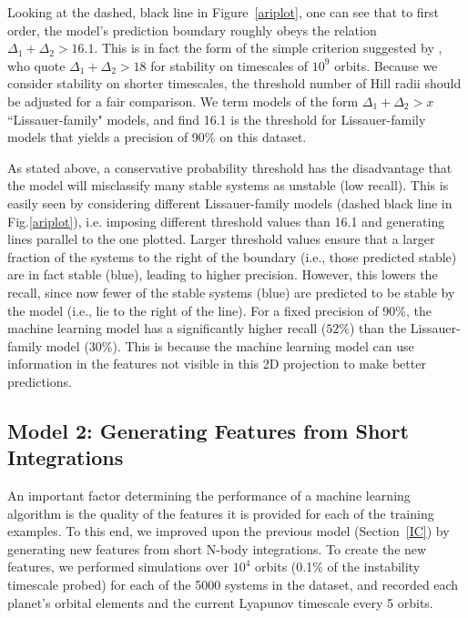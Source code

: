 Looking at the dashed, black line in Figure~\ref{ariplot}, one can see that to first order, the model's prediction boundary roughly obeys the relation $\Delta_1 + \Delta_2 > 16.1$.
This is in fact the form of the simple criterion suggested by \cite{Lissauer2011}, who quote $\Delta_1 + \Delta_2 > 18$ for stability on timescales of $10^9$ orbits. 
Because we consider stability on shorter timescales, the threshold number of Hill radii should be adjusted for a fair comparison.
We term models of the form $\Delta_1 + \Delta_2 > x$ ``Lissauer-family" models, and find 16.1 is the threshold for Lissauer-family models that yields a precision of 90\% on this dataset.

As stated above, a conservative probability threshold has the disadvantage that the model will misclassify many stable systems as unstable (low recall).  
This is easily seen by considering different Lissauer-family models (dashed black line in Fig.\:\ref{ariplot}), i.e. imposing different threshold values than 16.1 and generating lines parallel to the one plotted.
Larger threshold values ensure that a larger fraction of the systems to the right of the boundary (i.e., those predicted stable) are in fact stable (blue), leading to higher precision.
However, this lowers the recall, since now fewer of the stable systems (blue) are predicted to be stable by the model (i.e., lie to the right of the line).
For a fixed precision of 90\%, the machine learning model has a significantly higher recall ($52\%$) than the Lissauer-family model ($30\%$). 
This is because the machine learning model can use information in the features not visible in this 2D projection to make better predictions.


\subsection{Model 2: Generating Features from Short Integrations} \label{shortintegrations}

An important factor determining the performance of a machine learning algorithm is the quality of the features it is provided for each of the training examples.
To this end, we improved upon the previous model (Section~\ref{IC}) by generating new features from short N-body integrations.
To create the new features, we performed simulations over $10^4$ orbits (0.1\% of the instability timescale probed) for each of the 5000 systems in the dataset, and recorded each planet's orbital elements and the current Lyapunov timescale every 5 orbits.

